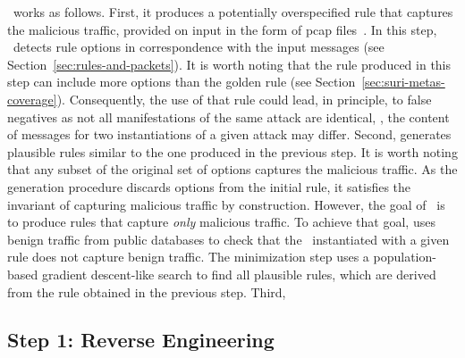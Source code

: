 \documentclass[sigconf,anonymous]{acmart}
\begin{document}
\tname\ works as follows. First, it produces a potentially
overspecified rule that captures the malicious traffic, provided on
input in the form of pcap files~\cite{pcap}. In this step,
\tname\ detects rule options in correspondence with the input messages
(see Section~\ref{sec:rules-and-packets}). It is worth noting that the
rule produced in this step can include more options than the golden
rule (see Section~\ref{sec:suri-metas-coverage}). Consequently, the
use of that rule could lead, in principle, to false negatives as not
all manifestations of the same attack are identical, \ie{}, the
content of messages for two instantiations of a given attack may
differ. Second, \tname{} generates plausible rules similar to the one
produced in the previous step. It is worth noting that any subset of
the original set of options captures the malicious traffic. As the
generation procedure discards options from the initial rule, it
satisfies the invariant of capturing malicious traffic by
construction. However, the goal of \tname\ is to produce rules that
capture \emph{only} malicious traffic. To achieve that goal, \tname{}
uses benign traffic from public databases to check that the
\nids\ instantiated with a given rule does not capture benign
traffic. The minimization step uses a population-based gradient
descent-like search to find all plausible rules, which are derived
from the rule obtained in the previous step. Third,






\subsection{Step 1: Reverse Engineering}
\end{document}
